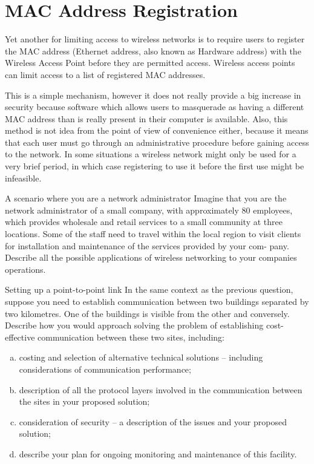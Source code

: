 \section{MAC Address Registration}

Yet another for limiting access to wireless networks is to require users to register the MAC address (Ethernet address, also known as Hardware address) with the Wireless Access Point before they are permitted access. Wireless access points can limit access to a list of registered MAC addresses.

This is a simple mechanism, however it does not really provide a big increase in security because software which allows users to masquerade as having a different MAC address than is really present in their computer is available. Also, this method is not idea from the point of view of convenience either, because it means that each user must go through an administrative procedure before gaining access to the network. In some situations a wireless network might only be used for a very brief period, in which case registering to use it before the first use might be infeasible.

\begin{exercise}{A scenario where you are a network administrator}
Imagine that you are the network administrator of a small company, with
approximately 80 employees, which provides wholesale and retail services to a small
community at three locations. Some of the staff need to travel within the local region
to visit clients for installation and maintenance of the services provided by your com-
pany. Describe all the possible applications of wireless networking to your companies
operations.
\end{exercise}

\begin{exercise}{Setting up a point-to-point link}
In the same context as the previous question, suppose you need to establish 
communication between two buildings separated by two kilometres. One of the
buildings is visible from the other and conversely. Describe how you would approach
solving the problem of establishing cost-effective communication between these two
sites, including:
\begin{enumerate}[(a)]
\item costing and selection of alternative technical solutions – including considerations
of communication performance;
\item description of all the protocol layers involved in the communication between the
sites in your proposed solution;
\item consideration of security – a description of the issues and your proposed solution;
\item describe your plan for ongoing monitoring and maintenance of this facility.
\end{enumerate}
\end{exercise}

